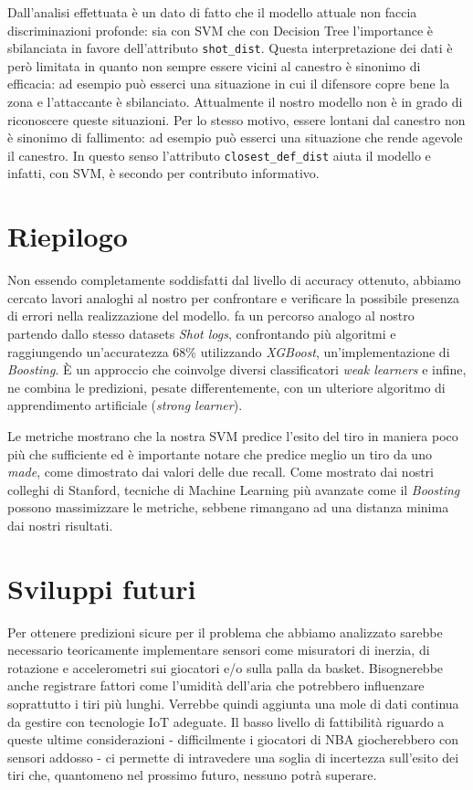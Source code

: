 Dall'analisi effettuata è un dato di fatto che il modello attuale non faccia discriminazioni profonde: sia con SVM che con Decision Tree l'importance è sbilanciata in favore dell'attributo \texttt{shot\_dist}. 
Questa interpretazione dei dati è però limitata in quanto non sempre essere vicini al canestro è sinonimo di efficacia: ad esempio può esserci una situazione in cui il difensore copre bene la zona e l'attaccante è sbilanciato. Attualmente il nostro modello non è in grado di riconoscere queste situazioni. Per lo stesso motivo, essere lontani dal canestro non è sinonimo di fallimento: ad esempio può esserci una situazione che rende agevole il canestro.
In questo senso l'attributo \texttt{closest\_def\_dist} aiuta il modello e infatti, con SVM, è secondo per contributo informativo.

\section{Riepilogo}

\par
Non essendo completamente soddisfatti dal livello di accuracy ottenuto, abbiamo cercato lavori analoghi al nostro per confrontare e verificare la possibile presenza di errori nella realizzazione del modello. \cite{predictingNBAst} fa un percorso analogo al nostro partendo dallo stesso datasets \textit{Shot logs}, confrontando più algoritmi e raggiungendo un'accuratezza  68\% utilizzando \textit{XGBoost}, un'implementazione di \textit{Boosting}. È un approccio che coinvolge diversi classificatori \textit{weak learners} e infine, ne combina le predizioni, pesate differentemente, con un ulteriore algoritmo di apprendimento artificiale (\textit{strong learner}).

Le metriche mostrano che la nostra SVM predice l'esito del tiro in maniera poco più che sufficiente ed è importante notare che predice meglio un tiro  da uno \textit{made}, come dimostrato dai valori delle due recall.
Come mostrato dai nostri colleghi di Stanford, tecniche di Machine Learning più avanzate come il \textit{Boosting} possono massimizzare le metriche, sebbene rimangano ad una distanza minima dai nostri risultati.

\section{Sviluppi futuri}
Per ottenere predizioni sicure per il problema che abbiamo analizzato sarebbe necessario teoricamente implementare sensori come misuratori di inerzia, di rotazione e accelerometri sui giocatori e/o sulla palla da basket. Bisognerebbe anche registrare fattori come l'umidità dell'aria che potrebbero influenzare soprattutto i tiri più lunghi. Verrebbe quindi aggiunta una mole di dati continua da gestire con tecnologie IoT adeguate. Il basso livello di fattibilità riguardo a queste ultime considerazioni - difficilmente i giocatori di NBA giocherebbero con sensori addosso - ci permette di intravedere una soglia di incertezza sull'esito dei tiri che, quantomeno nel prossimo futuro, nessuno potrà superare.

